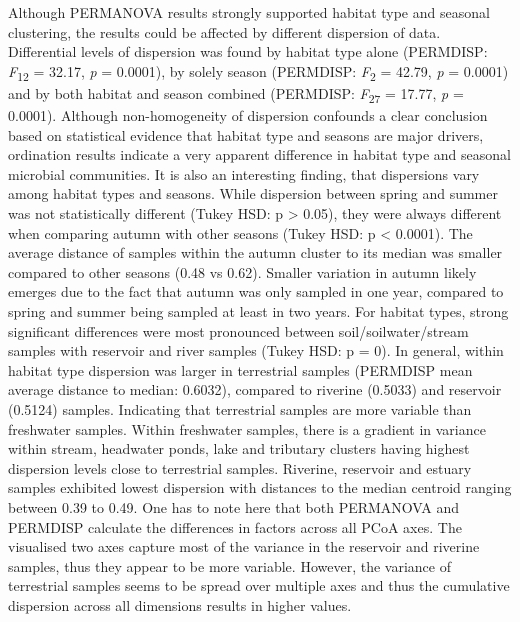\documentclass[12pt,a4paper]{article} %
\begin{document}
Although PERMANOVA results strongly supported habitat type and seasonal clustering, the results could be affected by different dispersion of data. Differential levels of dispersion was found by habitat type alone (PERMDISP: \textit{F}\textsubscript{12} = 32.17, \textit{p} = 0.0001), by solely season (PERMDISP: \textit{F}\textsubscript{2} = 42.79, \textit{p} = 0.0001) and by both habitat and season combined (PERMDISP: \textit{F}\textsubscript{27} = 17.77, \textit{p} = 0.0001). Although non-homogeneity of dispersion confounds a clear conclusion based on statistical evidence that habitat type and seasons are major drivers, ordination results indicate a very apparent difference in habitat type and seasonal microbial communities. It is also an interesting finding, that dispersions vary among habitat types and seasons. While dispersion between spring and summer was not statistically different (Tukey HSD: p > 0.05), they were always different when comparing autumn with other seasons (Tukey HSD: p < 0.0001). The average distance of samples within the autumn cluster to its median was smaller compared to other seasons (0.48 vs 0.62). Smaller variation in autumn likely emerges due to the fact that autumn was only sampled in one year, compared to spring and summer being sampled at least in two years. For habitat types, strong significant differences were most pronounced between soil/soilwater/stream samples with reservoir and river samples (Tukey HSD: p = 0). In general, within habitat type dispersion was larger in terrestrial samples (PERMDISP mean average distance to median: 0.6032), compared to riverine (0.5033) and reservoir (0.5124) samples. Indicating that terrestrial samples are more variable than freshwater samples. Within freshwater samples, there is a gradient in variance within stream, headwater ponds, lake and tributary clusters having highest dispersion levels close to terrestrial samples. Riverine, reservoir and estuary samples exhibited lowest dispersion with distances to the median centroid ranging between 0.39 to 0.49. One has to note here that both PERMANOVA and PERMDISP calculate the differences in factors across all PCoA axes. The visualised two axes capture most of the variance in the reservoir and riverine samples, thus they appear to be more variable. However, the variance of terrestrial samples seems to be spread over multiple axes and thus the cumulative dispersion across all dimensions results in higher values.
\end{document}
